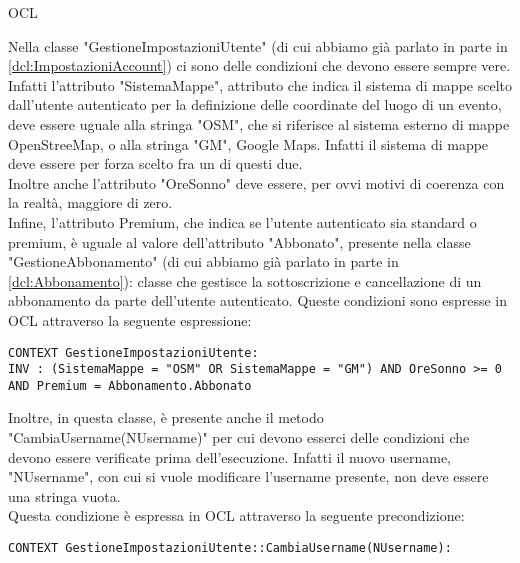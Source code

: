 \begin{listaPersonale}{OCL}
    \begin{center}
        
    \end{center}
    Nella classe "GestioneImpostazioniUtente" (di cui abbiamo già parlato in parte in \ref{dcl:ImpostazioniAccount}) ci sono delle condizioni che devono essere sempre vere. Infatti l'attributo "SistemaMappe", attributo che indica il sistema di mappe scelto dall'utente autenticato per la definizione delle coordinate del luogo di un evento, deve essere uguale alla stringa "OSM", che si riferisce al sistema esterno di mappe OpenStreeMap, o alla stringa "GM", Google Maps. Infatti il sistema di mappe deve essere per forza scelto fra un di questi due. \\
    Inoltre anche l'attributo "OreSonno" deve essere, per ovvi motivi di coerenza con la realtà, maggiore di zero. \\
    Infine, l'attributo Premium, che indica se l'utente autenticato sia standard o premium, è uguale al valore dell'attributo "Abbonato", presente nella classe "GestioneAbbonamento" (di cui abbiamo già parlato in parte in \ref{dcl:Abbonamento}): classe che gestisce la sottoscrizione e cancellazione di un abbonamento da parte dell'utente autenticato.
    Queste condizioni sono espresse in OCL attraverso la seguente espressione:
    \begin{lstlisting}
CONTEXT GestioneImpostazioniUtente:
INV : (SistemaMappe = "OSM" OR SistemaMappe = "GM") AND OreSonno >= 0 AND Premium = Abbonamento.Abbonato
    \end{lstlisting}
    Inoltre, in questa classe, è presente anche il metodo "CambiaUsername(NUsername)" per cui devono esserci delle condizioni che devono essere verificate prima dell'esecuzione. Infatti il nuovo username, "NUsername", con cui si vuole modificare l'username presente, non deve essere una stringa vuota. \\
    Questa condizione è espressa in OCL attraverso la seguente precondizione:
    \begin{lstlisting}
CONTEXT GestioneImpostazioniUtente::CambiaUsername(NUsername):

\end{lstlisting}
\end{listaPersonale}
